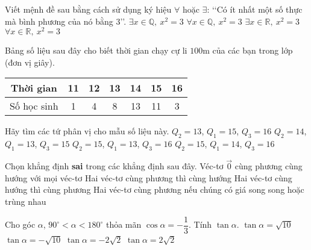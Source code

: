 \begin{ex}%
	Viết mệnh đề sau bằng cách sử dụng ký hiệu $\forall$ hoặc $\exists$: \lq \lq Có ít nhất một số thực mà bình phương của nó bằng $3$\rq\rq.
	\choice
	{$\exists x \in \mathbb{Q}, \ x^2=3$}
	{$\forall x \in \mathbb{Q}, \ x^2=3$}
	{\True $\exists x \in \mathbb{R}, \ x^2=3$}
	{$\forall x \in \mathbb{R}, \ x^2=3$}
\end{ex}

\begin{ex}%
	Bảng số liệu sau đây cho biết thời gian chạy cự li $100$m của các bạn trong lớp (đơn vị giây).
	\begin{center}
		\begin{tabular}{|c|c|c|c|c|c|c|}
			\hline
			Thời gian & 11 &12 &13& 14 &15 &16 \\
			 \hline
			Số học sinh & 1 &4& 8& 13 &11 &3 \\ 
			\hline 
		\end{tabular}
	\end{center}
	Hãy tìm các tứ phân vị cho mẫu số liệu này.
	\choice
	{$Q_2=13$, $Q_1=15$, $Q_3=16$}
	{$Q_2=14$, $Q_1=13$, $Q_3=15$}
	{$Q_2=15$, $Q_1=13$, $Q_3=16$}
	{$Q_2=15$, $Q_1=14$, $Q_3=16$}
\end{ex}

\begin{ex}%
	Chọn khẳng định \textbf{sai} trong các khẳng định sau đây.
	\choice
	{Véc-tơ $\overrightarrow{0}$ cùng phương cùng hướng với mọi véc-tơ}
	{\True Hai véc-tơ cùng phương thì cùng hướng}
	{Hai véc-tơ cùng hướng thì cùng phương}
	{Hai véc-tơ cùng phương nếu chúng có giá song song hoặc trùng nhau}
\end{ex}

\begin{ex}%
	Cho góc $\alpha$, $90^{\circ}<\alpha < 180^{\circ}$ thỏa mãn $\cos \alpha =-\dfrac{1}{3}$. Tính $\tan \alpha$.
	\choice
	{$\tan \alpha =\sqrt{10}$}
	{$\tan \alpha =-\sqrt{10}$}
	{\True $\tan \alpha =-2\sqrt{2}$}
	{$\tan \alpha =2\sqrt{2}$}
\end{ex}


